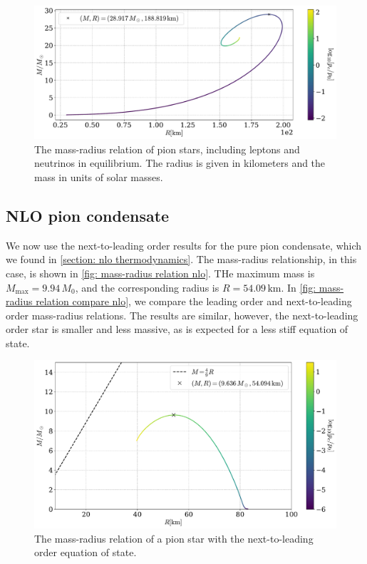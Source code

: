 \begin{figure}[!htb]
    \centering
    \includegraphics[width=\textwidth]{../scripts/figurer/pion_star/mass_radius_neutrino.pdf}
    \caption{
        The mass-radius relation of pion stars, including leptons and neutrinos in equilibrium.
        The radius is given in kilometers and the mass in units of solar masses.
        }
        \label{fig: mass radius neutrino}
\end{figure}


\subsection{NLO pion condensate}

We now use the next-to-leading order results for the pure pion condensate, which we found in \autoref{section: nlo thermodynamics}.
The mass-radius relationship, in this case, is shown in \autoref{fig: mass-radius relation nlo}.
THe maximum mass is $M_\text{max} = 9.94\, M_0$, and the corresponding radius is $R = 54.09\,\text{km}$.
In \autoref{fig: mass-radius relation compare nlo}, we compare the leading order and next-to-leading order mass-radius relations.
The results are similar, however, the next-to-leading order star is smaller and less massive, as is expected for a less stiff equation of state.

\begin{figure}[!htb]
    \centering
    \includegraphics[width=\textwidth]{../scripts/figurer/pion_star/mass_radius_pion_star_nlo.pdf}
    \caption{The mass-radius relation of a pion star with the next-to-leading order equation of state.}
    \label{fig: mass-radius relation nlo}
\end{figure}

